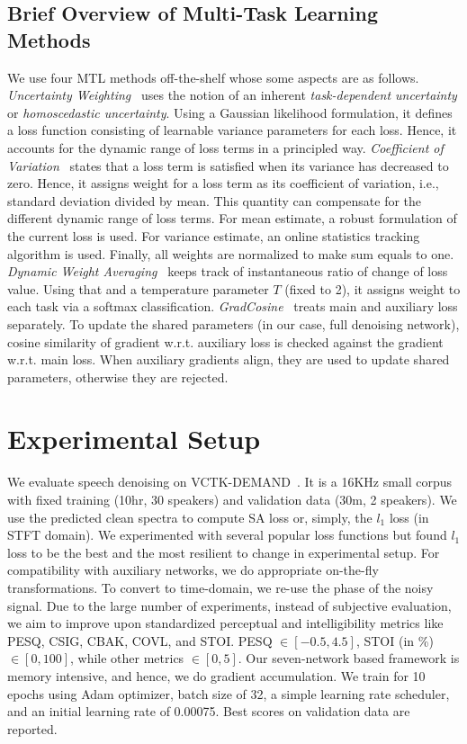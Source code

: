 \documentclass{article}
\begin{document}
\subsection{Brief Overview of Multi-Task Learning Methods}
We use four \ac{MTL} methods off-the-shelf whose some aspects are as follows.
\emph{Uncertainty Weighting}~\cite{kendall2018multi} uses the notion of an inherent \emph{task-dependent uncertainty} or \emph{homoscedastic uncertainty}.
Using a Gaussian likelihood formulation, it defines a loss function consisting of learnable variance parameters for each loss.
Hence, it accounts for the dynamic range of loss terms in a principled way.
\emph{Coefficient of Variation}~\cite{groenendijk2020multi} states that a loss term is satisfied when its variance has decreased to zero.
Hence, it assigns weight for a loss term as its coefficient of variation, i.e., standard deviation divided by mean.
This quantity can compensate for the different dynamic range of loss terms.
For mean estimate, a robust formulation of the current loss is used.
For variance estimate, an online statistics tracking algorithm is used.
Finally, all weights are normalized to make sum equals to one.
\emph{Dynamic Weight Averaging}~\cite{liu2019end} keeps track of instantaneous ratio of change of loss value.
Using that and a temperature parameter $T$ (fixed to 2), it assigns weight to each task via a softmax classification.
\emph{GradCosine}~\cite{du2018adapting} treats main and auxiliary loss separately.
To update the shared parameters (in our case, full denoising network), cosine similarity of gradient w.r.t. auxiliary loss is checked against the gradient w.r.t. main loss.
When auxiliary gradients align, they are used to update shared parameters, otherwise they are rejected.


\section{Experimental Setup}
\label{sec:exp}
We evaluate speech denoising on VCTK-DEMAND~\cite{valentini2016investigating}.
It is a 16KHz small corpus with fixed training (10hr, 30 speakers) and validation data (30m, 2 speakers).
We use the predicted clean spectra to compute \ac{SA} loss or, simply, the $l_1$ loss (in STFT domain).
We experimented with several popular loss functions but found $l_1$ loss to be the best and the most resilient to change in experimental setup.
For compatibility with auxiliary networks, we do appropriate on-the-fly transformations.
To convert to time-domain, we re-use the phase of the noisy signal.
Due to the large number of experiments, instead of subjective evaluation, we aim to improve upon standardized perceptual and intelligibility metrics like PESQ, CSIG, CBAK, COVL, and STOI.
PESQ $\in [-0.5,4.5]$, STOI (in \%) $\in [0,100]$, while other metrics $\in [0,5]$.
Our seven-network based framework is memory intensive, and hence, we do gradient accumulation.
We train for 10 epochs using Adam optimizer, batch size of 32, a simple learning rate scheduler, and an initial learning rate of 0.00075.
Best scores on validation data are reported.
\end{document}
